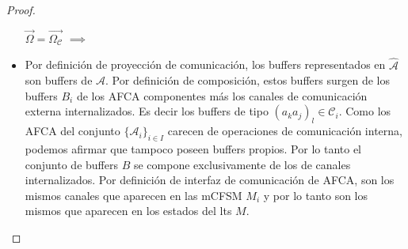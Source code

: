 \begin{proof}
\begin{itemize}
    
    
    
    \item[\textbf{$\overrightarrow{\Omega} = \overrightarrow{\Omega_\mathcal{C}}$} $\implies$] 
    
    \item Por definición de proyección de comunicación, los buffers representados en $\hat{\mathcal{A}}$ son buffers de $\mathcal{A}$. Por definición de composición, estos buffers surgen de los buffers $B_i$ de los AFCA componentes más los canales de comunicación externa internalizados. Es decir los buffers de tipo $(a_ka_j)_l \in \mathcal{C}_i$. Como los AFCA del conjunto $\{\mathcal{A}_i\}_{i \in I}$ carecen de operaciones de comunicación interna, podemos afirmar que tampoco poseen buffers propios. Por lo tanto el conjunto de buffers $B$ se compone exclusivamente de los de canales internalizados. Por definición de interfaz de comunicación de AFCA, son los mismos canales que aparecen en las mCFSM $M_i$ y por lo tanto son los mismos que aparecen en los estados del lts $M$.


\end{itemize}
\end{proof}
